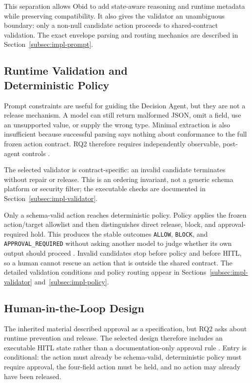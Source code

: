 This separation allows Obid to add state-aware reasoning and runtime metadata
while preserving compatibility. It also gives the validator an unambiguous
boundary: only a non-null candidate action proceeds to shared-contract
validation. The exact envelope parsing and routing mechanics are described in
Section~\ref{subsec:impl-prompt}.

\subsection[Runtime Validation and Deterministic Policy]{Runtime Validation and\\Deterministic Policy}\label{subsec:design-safety}

Prompt constraints are useful for guiding the Decision Agent, but they are not
a release mechanism. A model can still return malformed JSON, omit a field,
use an unsupported value, or supply the wrong type. Minimal extraction is also
insufficient because successful parsing says nothing about conformance to the
full frozen action contract. RQ2 therefore requires independently observable,
post-agent controls \cite{wright2022jsonschemavalidation}.

The selected validator is contract-specific: an invalid candidate terminates
without repair or release. This is an ordering invariant, not a generic schema
platform or security filter; the executable checks are documented in
Section~\ref{subsec:impl-validator}.

Only a schema-valid action reaches deterministic policy. Policy applies the
frozen action/target allowlist and then distinguishes direct release, block, and
approval-required hold. This produces the stable outcomes \texttt{ALLOW},
\texttt{BLOCK}, and \mbox{\texttt{APPROVAL\_REQUIRED}} without asking another model to
judge whether its own output should proceed
\cite{schneider2000enforceable,wang2026agentspec}. Invalid candidates stop before
policy and before HITL, so a human cannot rescue an action that is outside the
shared contract. The detailed validation conditions and policy routing appear
in Sections~\ref{subsec:impl-validator} and~\ref{subsec:impl-policy}.

\subsection{Human-in-the-Loop Design}\label{subsec:design-hitl}

The inherited material described approval as a specification, but RQ2 asks
about runtime prevention and release. The selected design therefore includes an
executable HITL state rather than a documentation-only approval rule
\cite{amershi2019guidelines,dzindolet2003trust,nist2023airmf}. Entry is
conditional: the action must already be schema-valid, deterministic policy must
require approval, the four-field action must be held, and no action may already
have been released.

